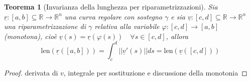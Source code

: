 \documentclass[12pt, a4paper]{article}
\theoremstyle{break}
\newtheorem{theorem}{Teorema} %
\begin{document}
\newpage
\begin{theorem} [Invarianza della lunghezza per riparametrizzazioni]
	Sia $\underline{r}: [a,b] \subseteq \mathbb{R} \to \mathbb{R}^n$ una curva
	regolare con sostegno $\gamma$ e sia $\underline{v}: [c,d] \subseteq
		\mathbb{R} \to \mathbb{R}^n$ una riparametrizzazione di $\gamma$ relativa
	alla variabile $ \varphi : [c,d] \to [a,b]$ (monotona), cioè
	$\underline{v}(s) = \underline{r}(\varphi (s)) \quad \forall s \in [c,d]$,
	allora
	\[
		\text{len}(\underline{r}([a,b])) = \int_{c}^{d} || \underline{v}'(s) ||
		ds = \text{len}(\underline{v}([c,d]))
	\]
\end{theorem}
\begin{proof} derivata di $v$, integrale per sostituzione e discussione della
	monotonia
\end{proof}
\end{document}
